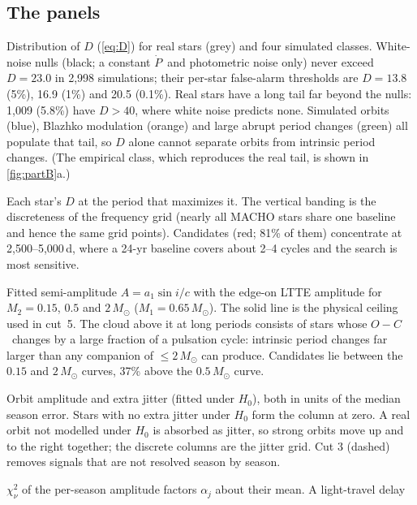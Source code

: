 \documentclass[11pt]{article}
\newcommand{\Msun}{\ensuremath{M_\odot}}
\newcommand{\OC}{\ensuremath{O{-}C}}
\newcommand{\Pdot}{\ensuremath{\dot P}}
\begin{document}
\subsection{The panels}\label{sec:panels}
\begin{description}[leftmargin=0pt,style=nextline]
\item[(a) Detection statistic.] Distribution of $D$ (\cref{eq:D}) for real stars (grey) and four simulated classes.
White-noise nulls (black; a constant \Pdot\ and photometric noise only) never exceed $D=23.0$ in 2{,}998 simulations; their
per-star false-alarm thresholds are $D=13.8$ (5\%), 16.9 (1\%) and 20.5 (0.1\%). Real stars have a long tail far beyond
the nulls: 1{,}009 (5.8\%) have $D>40$, where white noise predicts none. Simulated orbits (blue), Blazhko modulation (orange)
and large abrupt period changes (green) all populate that tail, so $D$ alone cannot separate orbits from intrinsic period
changes. (The empirical class, which reproduces the real tail, is shown in \cref{fig:partB}a.)
\item[(b) $D$ versus best period.] Each star's $D$ at the period that maximizes it. The vertical banding is the discreteness
of the frequency grid (nearly all MACHO stars share one baseline and hence the same grid points). Candidates (red; 81\% of
them) concentrate at 2{,}500--5{,}000\,d, where a 24-yr baseline covers about 2--4 cycles and the search is most sensitive.
\item[(c) Amplitude versus period.] Fitted semi-amplitude $A=a_1\sin i/c$ with the edge-on LTTE amplitude for
$M_2=0.15$, $0.5$ and $2\,\Msun$ ($M_1=0.65\,\Msun$). The solid line is the physical ceiling used in cut~5. The cloud
above it at long periods consists of stars whose \OC\ changes by a large fraction of a pulsation cycle: intrinsic
period changes far larger than any companion of $\le2\,\Msun$ can produce. Candidates lie between the $0.15$ and
$2\,\Msun$ curves, 37\% above the $0.5\,\Msun$ curve.
\item[(d) Signal versus timing noise.] Orbit amplitude and extra jitter (fitted under $H_0$), both in units of the median
season error. Stars with no extra jitter under $H_0$ form the column at zero. A real orbit not modelled under $H_0$ is
absorbed as jitter, so strong orbits move up and to the right together; the discrete columns are the jitter grid.
Cut 3 (dashed) removes signals that are not resolved season by season.
\item[(e) Blazhko veto.] $\chi^2_\nu$ of the per-season amplitude factors $\alpha_j$ about their mean. A light-travel delay

\end{description}
\end{document}
